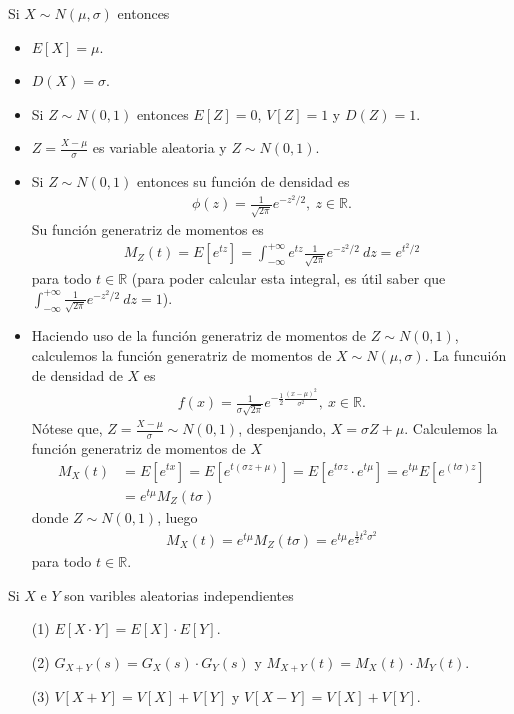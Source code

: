 \begin{obs}
Si $X \sim N(\mu, \sigma)$ entonces
\begin{itemize}
    \item $E[X] = \mu$.
    \item $D(X) = \sigma$.
    \item Si $Z \sim N(0,1)$ entonces $E[Z] = 0$, $V[Z] = 1$ y $D(Z) = 1$.
    \item $Z = \frac{X - \mu}{\sigma}$ es variable aleatoria y $Z \sim N(0,1)$.
    \item Si $Z \sim N(0,1)$ entonces su función de densidad es
    \begin{align*}
        \phi(z) = \frac{1}{\sqrt{2\pi}}e^{-z^2/2}, \ z \in \mathbb{R}.
    \end{align*}
    Su función generatriz de momentos es
    \begin{align*}
        M_Z(t) = E[e^{tz}] = \int_{-\infty}^{+\infty}{e^{tz}\frac{1}{\sqrt{2\pi}}e^{-z^2/2} \ dz} = e^{t^2/2}
    \end{align*}
    para todo $t \in \mathbb{R}$ (para poder calcular esta integral, es útil saber que $\int_{-\infty}^{+\infty}{\frac{1}{\sqrt{2\pi}}e^{-z^2/2} \ dz} = 1$).
    \item Haciendo uso de la función generatriz de momentos de $Z \sim N(0,1)$, calculemos la función generatriz de momentos de $X \sim N(\mu, \sigma)$. La funcuión de densidad de $X$ es
    \begin{align*}
    f(x) = \frac{1}{\sigma \sqrt{2\pi}}e^{-\frac{1}{2}\frac{(x - \mu)^2}{\sigma^2}}, \ x \in \mathbb{R}.
\end{align*}
Nótese que, $Z = \frac{X - \mu}{\sigma} \sim N(0,1)$, despenjando, $X = \sigma Z + \mu$. Calculemos la función generatriz de momentos de $X$
\begin{align*}
    M_X(t) &= E[e^{tx}] = E[e^{t(\sigma z + \mu)}] = E[e^{t\sigma z} \cdot e^{t \mu}] = e^{t \mu} E[e^{(t\sigma) z}]\\
    &= e^{t \mu}M_Z(t \sigma)
\end{align*}
donde $Z \sim N(0,1)$, luego
\begin{align*}
    M_X(t) = e^{t \mu}M_Z(t \sigma) = e^{t \mu}e^{\frac{1}{2}t^2 \sigma ^2}
\end{align*}
para todo $t \in \mathbb{R}$.
\end{itemize}
\end{obs}

\begin{obs}
Si $X$ e $Y$ son varibles aleatorias independientes
\begin{enumerate}
    \item[(1)] $E[X \cdot Y] = E[X] \cdot E[Y]$.
    \item[(2)] $G_{X + Y}(s) = G_X(s) \cdot G_Y(s)$ y $M_{X + Y}(t) = M_X(t) \cdot M_Y(t)$.
    \item[(3)] $V[X + Y] = V[X] + V[Y]$ y $V[X - Y] = V[X] + V[Y]$.
\end{enumerate}
\end{obs}

